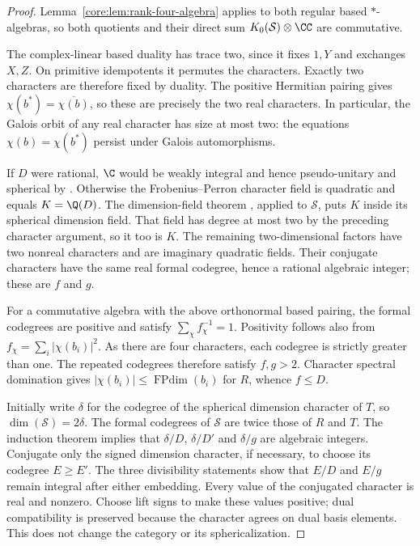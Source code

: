 \begin{proof}
Lemma~\ref{core:lem:rank-four-algebra} applies to both regular
based $*$-algebras, so both quotients and their direct sum
$K_0(\mathcal S)\otimes\CC$ are commutative.

The complex-linear based duality has trace two, since it fixes $1,Y$
and exchanges $X,Z$. On primitive idempotents it permutes the
characters. Exactly two characters are therefore fixed by duality.
The positive Hermitian pairing gives
$\chi(b^*)=\overline{\chi(b)}$, so these are precisely the two real
characters. In particular, the Galois orbit of any real character
has size at most two: the equations $\chi(b)=\chi(b^*)$ persist under
Galois automorphisms.

If $D$ were rational, $\C$ would be weakly integral and hence
pseudo-unitary and spherical by \cite[Proposition~8.24]{ENO}.
Otherwise the Frobenius--Perron character field is quadratic and
equals $K=\Q(D)$. The dimension-field theorem
\cite[Corollary~2.15]{Ostrik3}, applied to $\mathcal S$, puts $K$
inside its spherical dimension field. That field has degree at most
two by the preceding character argument, so it too is $K$.
The remaining two-dimensional factors have two nonreal characters
and are imaginary quadratic fields. Their conjugate characters have
the same real formal codegree, hence a rational algebraic integer;
these are $f$ and $g$.

For a commutative algebra with the above orthonormal based pairing,
the formal codegrees are positive and satisfy
$\sum_\chi f_\chi^{-1}=1$. Positivity follows also from
$f_\chi=\sum_i|\chi(b_i)|^2$. As there are four characters, each
codegree is strictly greater than one. The repeated codegrees
therefore satisfy $f,g>2$. Character spectral domination gives
$|\chi(b_i)|\leq\operatorname{FPdim}(b_i)$ for $R$, whence $f\leq D$.

Initially write $\delta$ for the codegree of the spherical dimension
character of $T$, so $\dim(\mathcal S)=2\delta$. The formal codegrees
of $\mathcal S$ are twice those of $R$ and $T$. The induction theorem
\cite[Theorem~2.13]{Ostrik3} implies that
$\delta/D$, $\delta/D'$ and $\delta/g$ are algebraic integers.
Conjugate only the signed dimension character, if necessary, to
choose its codegree $E\geq E'$. The three divisibility statements
show that $E/D$ and $E/g$ remain integral after either embedding.
Every value of the conjugated character is real and nonzero. Choose
lift signs to make these values positive; dual compatibility is
preserved because the character agrees on dual basis elements.
This does not change the category or its sphericalization.


\end{proof}
